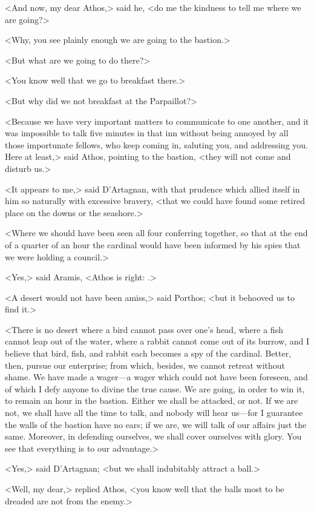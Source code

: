 <And now, my dear Athos,> said he, <do me the kindness to tell me where we are going?> 

<Why, you see plainly enough we are going to the bastion.> 

<But what are we going to do there?> 

<You know well that we go to breakfast there.> 

<But why did we not breakfast at the Parpaillot?> 

<Because we have very important matters to communicate to one another, and it was impossible to talk five minutes in that inn without being annoyed by all those importunate fellows, who keep coming in, saluting you, and addressing you. Here at least,> said Athos, pointing to the bastion, <they will not come and disturb us.> 

<It appears to me,> said D'Artagnan, with that prudence which allied itself in him so naturally with excessive bravery, <that we could have found some retired place on the downs or the seashore.> 

<Where we should have been seen all four conferring together, so that at the end of a quarter of an hour the cardinal would have been informed by his spies that we were holding a council.> 

<Yes,> said Aramis, <Athos is right: .> 

<A desert would not have been amiss,> said Porthos; <but it behooved us to find it.> 

<There is no desert where a bird cannot pass over one's head, where a fish cannot leap out of the water, where a rabbit cannot come out of its burrow, and I believe that bird, fish, and rabbit each becomes a spy of the cardinal. Better, then, pursue our enterprise; from which, besides, we cannot retreat without shame. We have made a wager—a wager which could not have been foreseen, and of which I defy anyone to divine the true cause. We are going, in order to win it, to remain an hour in the bastion. Either we shall be attacked, or not. If we are not, we shall have all the time to talk, and nobody will hear us—for I guarantee the walls of the bastion have no ears; if we are, we will talk of our affairs just the same. Moreover, in defending ourselves, we shall cover ourselves with glory. You see that everything is to our advantage.> 

<Yes,> said D'Artagnan; <but we shall indubitably attract a ball.> 

<Well, my dear,> replied Athos, <you know well that the balls most to be dreaded are not from the enemy.> 

